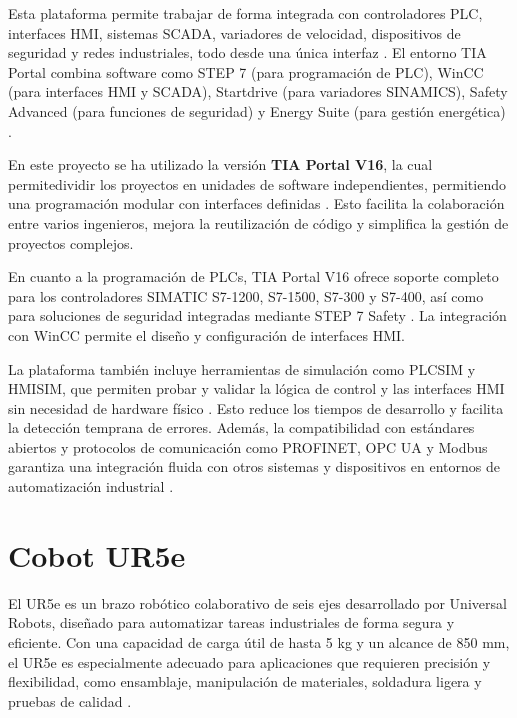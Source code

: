Esta plataforma permite trabajar de forma integrada con controladores PLC, interfaces HMI, sistemas SCADA, variadores de velocidad, dispositivos de seguridad y redes industriales, todo desde una única interfaz \cite{TIA_portal}. El entorno TIA Portal combina software como STEP 7 (para programación de PLC), WinCC (para interfaces HMI y SCADA), Startdrive (para variadores SINAMICS), Safety Advanced (para funciones de seguridad) y Energy Suite (para gestión energética) \cite{TIA_portal}.

En este proyecto se ha utilizado la versión \textbf{TIA Portal V16}, la cual permitedividir los proyectos en unidades de software independientes, permitiendo una programación modular con interfaces definidas \cite{TIA_portal}. Esto facilita la colaboración entre varios ingenieros, mejora la reutilización de código y simplifica la gestión de proyectos complejos.

En cuanto a la programación de PLCs, TIA Portal V16 ofrece soporte completo para los controladores SIMATIC S7-1200, S7-1500, S7-300 y S7-400, así como para soluciones de seguridad integradas mediante STEP 7 Safety \cite{TIA_portal}. La integración con WinCC permite el diseño y configuración de interfaces HMI.

La plataforma también incluye herramientas de simulación como PLCSIM y HMISIM, que permiten probar y validar la lógica de control y las interfaces HMI sin necesidad de hardware físico \cite{TIA_portal}. Esto reduce los tiempos de desarrollo y facilita la detección temprana de errores. Además, la compatibilidad con estándares abiertos y protocolos de comunicación como PROFINET, OPC UA y Modbus garantiza una integración fluida con otros sistemas y dispositivos en entornos de automatización industrial \cite{TIA_portal}.

\section{Cobot UR5e}

El UR5e es un brazo robótico colaborativo de seis ejes desarrollado por Universal Robots, diseñado para automatizar tareas industriales de forma segura y eficiente. Con una capacidad de carga útil de hasta 5 kg y un alcance de 850 mm, el UR5e es especialmente adecuado para aplicaciones que requieren precisión y flexibilidad, como ensamblaje, manipulación de materiales, soldadura ligera y pruebas de calidad \cite{UR5e}.

